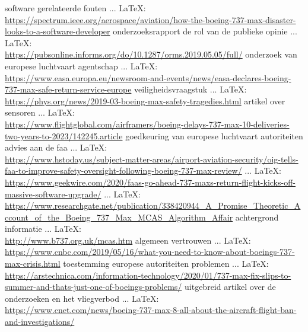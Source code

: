 \begin{thebibliography}{99}
{{{software gerelateerde fouten
 ... \LaTeX:\\ \url{https://spectrum.ieee.org/aerospace/aviation/how-the-boeing-737-max-disaster-looks-to-a-software-developer}
onderzoeksrapport
de rol van de publieke opinie
 ... \LaTeX:\\ \url{https://pubsonline.informs.org/do/10.1287/orms.2019.05.05/full/}
onderzoek van europese luchtvaart agentschap
 ... \LaTeX:\\ \url{https://www.easa.europa.eu/newsroom-and-events/news/easa-declares-boeing-737-max-safe-return-service-europe}
veiligheidsvraagstuk
 ... \LaTeX:\\ \url{https://phys.org/news/2019-03-boeing-max-safety-tragedies.html}
artikel over sensoren
 ... \LaTeX:\\ \url{https://www.flightglobal.com/airframers/boeing-delays-737-max-10-deliveries-two-years-to-2023/142245.article}
goedkeuring van europese luchtvaart autoriteiten
advies aan de faa
 ... \LaTeX:\\ \url{https://www.hstoday.us/subject-matter-areas/airport-aviation-security/oig-tells-faa-to-improve-safety-oversight-following-boeing-737-max-review/}
 ... \LaTeX:\\ \url{https://www.geekwire.com/2020/faas-go-ahead-737-maxs-return-flight-kicks-off-massive-software-upgrade/}
 ... \LaTeX:\\ \url{https://www.researchgate.net/publication/338420944_A_Promise_Theoretic_Account_of_the_Boeing_737_Max_MCAS_Algorithm_Affair}
achtergrond informatie
 ... \LaTeX:\\ \url{http://www.b737.org.uk/mcas.htm}
algemeen vertrouwen
 ... \LaTeX:\\ \url{https://www.cnbc.com/2019/05/16/what-you-need-to-know-about-boeings-737-max-crisis.html}
toestemming europese autoriteiten
problemen
 ... \LaTeX:\\ \url{https://arstechnica.com/information-technology/2020/01/737-max-fix-slips-to-summer-and-thats-just-one-of-boeings-problems/}
uitgebreid artikel over de onderzoeken en het vliegverbod
 ... \LaTeX:\\ \url{https://www.cnet.com/news/boeing-737-max-8-all-about-the-aircraft-flight-ban-and-investigations/}
}}}
\end{thebibliography}
